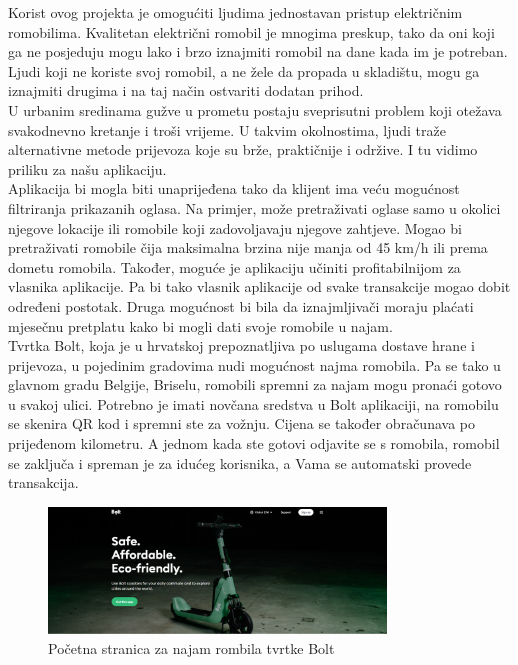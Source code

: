 		\indent Korist ovog projekta je omogućiti ljudima jednostavan pristup električnim romobilima. Kvalitetan električni romobil je mnogima preskup, tako da oni koji ga ne posjeduju mogu lako i brzo iznajmiti romobil na dane kada im je potreban. Ljudi koji ne koriste svoj romobil, a ne žele da propada u skladištu, mogu ga iznajmiti drugima i na taj način ostvariti dodatan prihod. \\
		\indent U urbanim sredinama gužve u prometu postaju sveprisutni problem koji otežava svakodnevno kretanje i troši vrijeme. U takvim okolnostima, ljudi traže alternativne metode prijevoza koje su brže, praktičnije i održive. I tu vidimo priliku za našu aplikaciju.\\
		
		\indent Aplikacija bi mogla biti unaprijeđena tako da klijent ima veću mogućnost filtriranja prikazanih oglasa. Na primjer, može pretraživati oglase samo u okolici njegove lokacije ili romobile koji zadovoljavaju njegove zahtjeve. Mogao bi pretraživati romobile čija maksimalna brzina nije manja od 45 km/h ili prema dometu romobila. Također, moguće je aplikaciju učiniti profitabilnijom za vlasnika aplikacije.
		Pa bi tako vlasnik aplikacije od svake transakcije mogao dobit određeni postotak. Druga mogućnost bi bila da iznajmljivači moraju plaćati mjesečnu pretplatu kako bi mogli dati svoje romobile u najam. \\
		
		\indent Tvrtka Bolt, koja je u hrvatskoj prepoznatljiva po uslugama dostave hrane i prijevoza, u pojedinim gradovima nudi mogućnost najma romobila. Pa se tako u glavnom gradu Belgije, Briselu, romobili spremni za najam mogu pronaći gotovo u svakoj ulici. Potrebno je imati novčana sredstva u Bolt aplikaciji, na romobilu se skenira QR kod i spremni ste za vožnju. Cijena se također obračunava po prijeđenom kilometru. A jednom kada ste gotovi odjavite se s romobila, romobil se zaključa i spreman je za idućeg korisnika, a Vama se automatski provede transakcija.
		
		\begin{figure}[h]
			\centering
			\includegraphics[width=0.8\textwidth]{slike/bolt-1.png}
			\caption{Početna stranica za najam rombila tvrtke Bolt}
			\label{fig:bolt-1}
		\end{figure}
		
